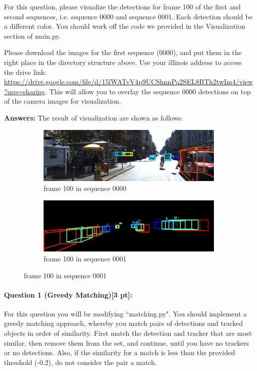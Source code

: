 \documentclass[11pt]{article}
\begin{document}
For this question, please visualize the detections for frame 100 of the first and second sequences, i.e. sequence 0000 and sequence 0001. Each detection should be a different color. You should work off the code we provided in the Visualization section of main.py.

Please download the images for the first sequence (0000), and put them in the right place in the directory structure above. Use your illinois address to access the drive link: \url{https://drive.google.com/file/d/15lWATvV4p9UCShnnPa2SEL8BTh2twIm4/view?usp=sharing}. This will allow you to overlay the sequence 0000 detections on top of the camera images for visualization. 

\textbf{Answers:} The result of visualization are shown as follows:

\begin{figure}[h]
    \centering
    \begin{subfigure}[b]{0.4\textwidth}
      \includegraphics[width=\textwidth]{./fig/Q0_00_100.jpg}
      \caption{frame 100 in sequence 0000}
    \end{subfigure}
    \hfill
    \begin{subfigure}[b]{0.4\textwidth}
      \includegraphics[width=\textwidth]{./fig/Q0_01_100.jpg}
      \caption{frame 100 in sequence 0001}
    \end{subfigure}
\end{figure}

\paragraph{Question 1 (Greedy Matching)[3 pt]:}
For this question you will be modifying ``matching.py". You should implement a greedy matching approach, whereby you match pairs of detections and tracked objects in order of similarity. First match the detection and tracker that are most similar, then remove them from the set, and continue, until you have no trackers or no detections. Also, if the similarity for a match is less than the provided threshold (-0.2), do not consider the pair a match.
\end{document}
